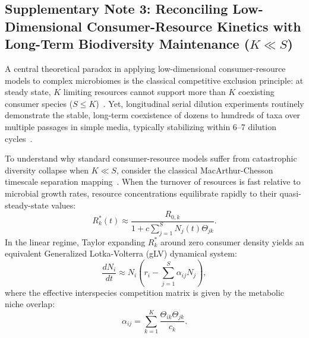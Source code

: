 \subsection*{Supplementary Note 3: Reconciling Low-Dimensional Consumer-Resource Kinetics with Long-Term Biodiversity Maintenance ($K \ll S$)}
\label{note:coexistence}

A central theoretical paradox in applying low-dimensional consumer-resource models to complex microbiomes is the classical competitive exclusion principle: at steady state, $K$ limiting resources cannot support more than $K$ coexisting consumer species ($S \le K$)~\cite{macarthur1970species,tilman1982resource}. Yet, longitudinal serial dilution experiments routinely demonstrate the stable, long-term coexistence of dozens to hundreds of taxa over multiple passages in simple media, typically stabilizing within 6--7 dilution cycles~\cite{goldford2018emergent,jin2023culturing}.

To understand why standard consumer-resource models suffer from catastrophic diversity collapse when $K \ll S$, consider the classical MacArthur-Chesson timescale separation mapping~\cite{macarthur1970species,chesson1990macarthur}. When the turnover of resources is fast relative to microbial growth rates, resource concentrations equilibrate rapidly to their quasi-steady-state values:
\begin{equation}
R_k^*(t) \approx \frac{R_{0, k}}{1 + c \sum_{j=1}^S N_j(t) \Theta_{jk}}.
\end{equation}
In the linear regime, Taylor expanding $R_k^*$ around zero consumer density yields an equivalent Generalized Lotka-Volterra (gLV) dynamical system:
\begin{equation}
\frac{dN_i}{dt} \approx N_i \left( r_i - \sum_{j=1}^S \alpha_{ij} N_j \right),
\end{equation}
where the effective interspecies competition matrix is given by the metabolic niche overlap:
\begin{equation}
\alpha_{ij} = \sum_{k=1}^K \frac{\Theta_{ik} \Theta_{jk}}{c_k}.
\label{eq:niche_overlap}
\end{equation}

